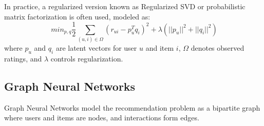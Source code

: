 \documentclass[sigconf,nonacm]{acmart} %
\begin{document}
In practice, a regularized version known as Regularized SVD or probabilistic matrix factorization is often used, modeled as:
\begin{equation}
\  min_{p,q} \frac{1} {2} \sum_{(u,i) \in \Omega} (r_{ui} - p_u^T q_i)^2 + \lambda (||p_u||^2 + ||q_i||^2)
\label{eq:regsvd}
\end{equation}
where $p_u$ and $q_i$ are latent vectors for user $u$ and item $i$, $\Omega$ denotes observed ratings, and $\lambda$ controls regularization.

\subsection{Graph Neural Networks}
Graph Neural Networks model the recommendation problem as a bipartite graph where users and items are nodes, and interactions form edges.
\end{document}
